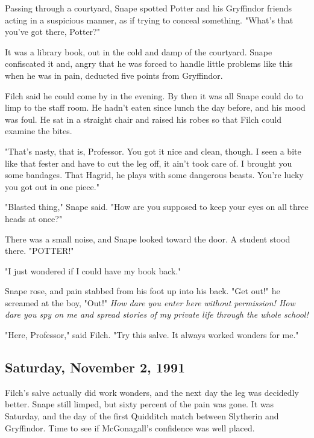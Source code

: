 Passing through a courtyard, Snape spotted Potter and his Gryffindor friends acting in a suspicious manner, as if trying to conceal something. "What's that you've got there, Potter?"

It was a library book, out in the cold and damp of the courtyard. Snape confiscated it and, angry that he was forced to handle little problems like this when he was in pain, deducted five points from Gryffindor.

Filch said he could come by in the evening. By then it was all Snape could do to limp to the staff room. He hadn't eaten since lunch the day before, and his mood was foul. He sat in a straight chair and raised his robes so that Filch could examine the bites.

"That's nasty, that is, Professor. You got it nice and clean, though. I seen a bite like that fester and have to cut the leg off, it ain't took care of. I brought you some bandages. That Hagrid, he plays with some dangerous beasts. You're lucky you got out in one piece."

"Blasted thing," Snape said. "How are you supposed to keep your eyes on all three heads at once?"

There was a small noise, and Snape looked toward the door. A student stood there. "POTTER!"

"I just wondered if I could have my book back."

Snape rose, and pain stabbed from his foot up into his back. "Get out!" he screamed at the boy, "Out!" \emph{How dare you enter here without permission! How dare you spy on me and spread stories of my private life through the whole school!}

"Here, Professor," said Filch. "Try this salve. It always worked wonders for me."

\subsection{Saturday, November 2, 1991}


Filch's salve actually did work wonders, and the next day the leg was decidedly better. Snape still limped, but sixty percent of the pain was gone. It was Saturday, and the day of the first Quidditch match between Slytherin and Gryffindor. Time to see if McGonagall's confidence was well placed.


